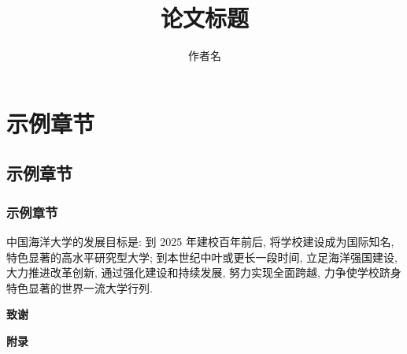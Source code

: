 \documentclass[zihao = -4,cn]{oucart}
\title{论文标题}
\author{作者名}
\begin{document}
\makecover

\makesignature

\makeabstract

\thispagestyle{tableofcontents}  
\tableofcontents

\newpage
{}
\setcounter{page}{1} 
\section{示例章节}
\subsection{示例章节}
\subsubsection{示例章节}
中国海洋大学的发展目标是: 到 2025 年建校百年前后, 将学校建设成为国际知名, 特色显著的高水平研究型大学; 到本世纪中叶或更长一段时间, 立足海洋强国建设, 大力推进改革创新, 通过强化建设和持续发展, 努力实现全面跨越, 力争使学校跻身特色显著的世界一流大学行列\cite{wiki:ouc}. 

\newpage

%


\newpage
\begin{center}
 \textbf{致谢} \\
\end{center}

\newpage
\begin{center}
 \textbf{附录} \\
\end{center}
\end{document}
